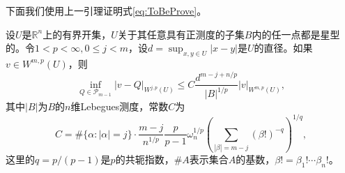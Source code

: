 \documentclass[a4paper,10pt]{ctexart}
\begin{document}
下面我们使用上一引理证明式\eqref{eq:ToBeProve}。
\begin{theorem}
    设$ U $是$ \mathbb{R}^n $上的有界开集，$ U $关于其任意具有正测度的子集$ B $内的任一点都是星型的。令$ 1<p<\infty,0\leqslant j<m $，设$ d = \sup_{x,y\in U}|x-y| $是$ U $的直径。如果$ v\in W^{m,p}(U) $，则
    \begin{equation}
        \inf_{Q\in \mathcal{P}_{m-1}} |v-Q|_{W^{j,p}(U)} \leqslant C \frac{d^{m-j+n / p}}{|B|^{1/p}} |v|_{W^{m,p}(U)},
    \end{equation}
    其中$ |B| $为$ B $的$ n $维Lebegues测度，常数$ C $为
    \begin{equation}
        C = \#\{\alpha:|\alpha|=j\}\cdot \frac{m-j}{n^{1 / p}} \frac{p}{p-1} \omega_n^{1 / p}\left( \sum_{|\beta|=m-j} (\beta!)^{-q} \right) ^{1 / q},
    \end{equation}
    这里的$ q = p / (p-1) $是$ p $的共轭指数，$ \#A $表示集合$ A $的基数，$ \beta! = \beta_1!\cdots \beta_n! $。
\end{theorem}
\end{document}
